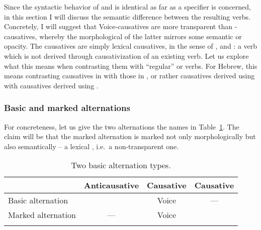 \begin{exe}
\begin{xlist}
\begin{xlist}
\begin{exe}
\begin{exe}
\begin{xlist}
\begin{exe}
\begin{xlist}
\begin{exe}
\begin{xlist}
\begin{xlist}
\begin{exe}
\begin{xlist}
\begin{exe}
\begin{xlist}
\begin{exe}
\begin{exe}
\begin{exe}
\begin{xlist}
\begin{exe}
\begin{exe}
\begin{xlist}
\begin{xlist}
\begin{exe}
\begin{xlist}
\begin{exe}
\begin{exe}
\begin{exe}
\begin{xlist}
\begin{exe}
\begin{exe}
\begin{xlist}
\begin{exe}
\begin{xlist}
\begin{exe}
\begin{xlist}
\begin{exe}
\begin{xlist}
\begin{exe}
Since the syntactic behavior of  and {\vd} is identical as far as  a specifier is concerned, in this section I will discuss the semantic difference between the resulting  verbs. Concretely, I will suggest that Voice-causatives are more transparent than {\vd}-causatives, whereby the morphological  of the latter mirrors some semantic  or opacity. The {\vd} causatives are simply lexical causatives, in the sense of \cite{fodor70}, \cite{miyagawa98} and \cite{harley08}: a  verb which is not derived through causativization of an existing verb. Let us explore what this means when contrasting them with ``regular''  or  verbs. For Hebrew, this means contrasting causatives in {\tkal} with those in {\thif}, or rather causatives derived using  with causatives derived using {\vd}.

		\subsubsection{Basic and marked alternations}
For concreteness, let us give the two alternations the names in Table~\ref{tab:4-4:alt}. The claim will be that the marked alternation is marked not only morphologically but also semantically -- a lexical , i.e.~a non-transparent one.
 \begin{table}
\begin{tabularx}{\textwidth}{lccc}
 \lsptoprule
	&	Anticausative & Causative & Causative\\\midrule
Basic alternation	& {\vz} & Voice & ---  \\
Marked alternation		&	---	&  Voice & {\vd}\\
\lspbottomrule
 \end{tabularx}
 	\caption{Two basic alternation types.}
	\label{tab:4-4:alt}
\end{table}


\end{exe}
\end{xlist}
\end{exe}
\end{xlist}
\end{exe}
\end{xlist}
\end{exe}
\end{xlist}
\end{exe}
\end{exe}
\end{xlist}
\end{exe}
\end{exe}
\end{exe}
\end{xlist}
\end{exe}
\end{xlist}
\end{xlist}
\end{exe}
\end{exe}
\end{xlist}
\end{exe}
\end{exe}
\end{exe}
\end{xlist}
\end{exe}
\end{xlist}
\end{exe}
\end{xlist}
\end{xlist}
\end{exe}
\end{xlist}
\end{exe}
\end{xlist}
\end{exe}
\end{exe}
\end{xlist}
\end{xlist}
\end{exe}
